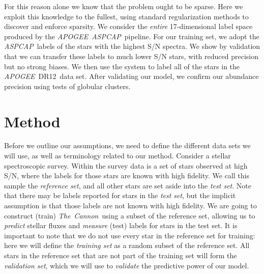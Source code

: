 \documentclass[12pt,preprint]{aastex}
\newcommand{\project}[1]{\textsl{#1}}
\newcommand{\TheCannon}{\project{The~Cannon}}
\newcommand{\acronym}[1]{{\small{#1}}}
\newcommand{\apogee}{\project{\acronym{APOGEE}}}
\newcommand{\aspcap}{\project{\acronym{ASPCAP}}}
\newcommand{\dr}{\acronym{DR12}}
\begin{document}
For this reason alone we know that the problem ought to be sparse.  Here we exploit this 
knowledge to the fullest, using standard regularization methods to discover
and enforce sparsity.  We consider the \emph{entire} 17-dimensional label space 
produced by the \apogee\ \aspcap\ pipeline.  For our training set, we adopt the \aspcap\ labels of the stars with 
the highest S/N spectra.  We show by validation that we can transfer these labels to much 
lower S/N stars, with reduced precision but no strong biases.  We then use the
system to label all of the stars in the \apogee\ \dr\ data set.  After
validating our model, we confirm our abundance precision using tests of globular
clusters.


\section{Method}


Before we outline our assumptions, we need to define the different data sets we
will use, as well as terminology related to our method. Consider a stellar spectroscopic
survey.  Within the survey data is a set of stars observed at high S/N, where the labels for those stars are known with high
fidelity.  We call this sample the \emph{reference set}, and all other stars
are set aside into the \emph{test set}.  Note that there may be labels
reported for stars in the \emph{test set}, but the implicit assumption is
that those labels are not known with high fidelity.  We are going to construct
(train) \TheCannon\ using a subset of the reference set, allowing us to 
\emph{predict} stellar fluxes and \emph{measure} (test) labels for stars in the 
test set.  It is important to note that we do not use every star in the
reference set for training: here we will define the \emph{training set} as a random
subset of the reference set.  All stars in the reference set that are not part of 
the training set will form the \emph{validation set}, which we will use to 
\emph{validate} the predictive power of our model.
\end{document}
